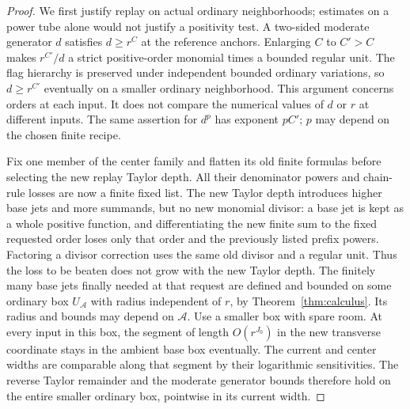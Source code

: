 \begin{proof}
We first justify replay on actual ordinary neighborhoods; estimates
on a power tube alone would not justify a positivity test.  A
two-sided moderate generator $d$ satisfies $d\ge r^C$ at the reference
anchors.
Enlarging $C$ to $C'>C$ makes $r^{C'}/d$ a strict positive-order
monomial times a bounded regular unit.  The flag hierarchy is
preserved under independent bounded ordinary variations, so
$d\ge r^{C'}$ eventually on a smaller ordinary neighborhood.
This argument concerns orders at each input.  It does not compare
the numerical values of $d$ or $r$ at different inputs.  The same
assertion for $d^p$ has exponent $pC'$; $p$ may depend on the chosen
finite recipe.

Fix one member of the center family and flatten its old finite
formulas before selecting the new replay Taylor depth.  All their
denominator powers and chain-rule losses are now a finite fixed
list.  The new Taylor depth introduces higher base jets and more
summands, but no new monomial divisor: a base jet is kept as a
whole positive function, and differentiating the new finite sum
to the fixed requested order loses only that order and the
previously listed prefix powers.  Factoring a divisor correction
uses the same old divisor and a regular unit.  Thus the loss to
be beaten does not grow with the new Taylor depth.
The finitely many base jets finally
needed at that request are defined and bounded on some ordinary
box $U_{\mathcal A}$ with radius independent of $r$, by
Theorem~\ref{thm:calculus}.  Its radius and bounds may depend on $\mathcal A$.
Use a smaller box with spare room.  At every input in this box,
the segment of length $O(r^{J_0})$ in the new transverse coordinate
stays in the ambient base box eventually.  The current and center
widths are comparable along that segment by their logarithmic
sensitivities.  The reverse Taylor remainder and the moderate
generator bounds therefore hold on the entire smaller ordinary
box, pointwise in its current width.


\end{proof}
